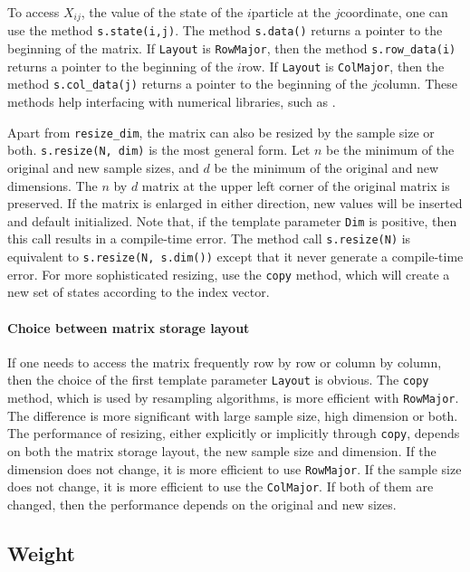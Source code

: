 To access $X_{ij}$, the value of the state of the $i$\ith particle at the
$j$\ith coordinate, one can use the method \verb|s.state(i,j)|. The method
\verb|s.data()| returns a pointer to the beginning of the matrix. If
\verb|Layout| is \verb|RowMajor|, then the method \verb|s.row_data(i)| returns
a pointer to the beginning of the $i$\ith row. If \verb|Layout| is
\verb|ColMajor|, then the method \verb|s.col_data(j)| returns a pointer to the
beginning of the $j$\ith column. These methods help interfacing with numerical
libraries, such as \blas.

Apart from \verb|resize_dim|, the matrix can also be resized by the sample size
or both. \verb|s.resize(N, dim)| is the most general form. Let $n$ be the
minimum of the original and new sample sizes, and $d$ be the minimum of the
original and new dimensions. The $n$ by $d$ matrix at the upper left corner of
the original matrix is preserved. If the matrix is enlarged in either
direction, new values will be inserted and default initialized. Note that, if
the template parameter \verb|Dim| is positive, then this call results in a
compile-time error. The method call \verb|s.resize(N)| is equivalent to
\verb|s.resize(N, s.dim())| except that it never generate a compile-time error.
For more sophisticated resizing, use the \verb|copy| method, which will create
a new set of states according to the index vector.

\paragraph{Choice between matrix storage layout}

If one needs to access the matrix frequently row by row or column by column,
then the choice of the first template parameter \verb|Layout| is obvious. The
\verb|copy| method, which is used by resampling algorithms, is more efficient
with \verb|RowMajor|. The difference is more significant with large sample
size, high dimension or both. The performance of resizing, either explicitly or
implicitly through \verb|copy|, depends on both the matrix storage layout, the
new sample size and dimension. If the dimension does not change, it is more
efficient to use \verb|RowMajor|. If the sample size does not change, it is
more efficient to use the \verb|ColMajor|. If both of them are changed, then
the performance depends on the original and new sizes.

\subsection{Weight}
\label{sub:Weight}

